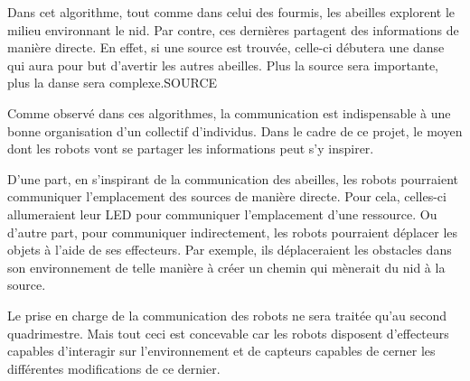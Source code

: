 Dans cet algorithme, tout comme dans celui des fourmis, les abeilles explorent le milieu environnant le nid. Par contre, ces dernières partagent des informations de manière directe. En effet, si une source est trouvée, celle-ci débutera une danse qui aura pour but d'avertir les autres abeilles. Plus la source sera importante, plus la danse sera complexe.SOURCE

Comme observé dans ces algorithmes, la communication est indispensable à une bonne organisation d'un collectif d'individus. Dans le cadre de ce projet, le moyen dont les robots vont se partager les informations peut s'y inspirer.

D'une part, en s'inspirant de la communication des abeilles, les robots pourraient communiquer l'emplacement des sources de manière directe. Pour cela, celles-ci allumeraient leur LED pour communiquer l'emplacement d'une ressource. Ou d'autre part, pour communiquer indirectement, les robots pourraient déplacer les objets à l'aide de ses effecteurs. Par exemple, ils déplaceraient les obstacles dans son environnement de telle manière à créer un chemin qui mènerait du nid à la source.

Le prise en charge de la communication des robots ne sera traitée qu'au second quadrimestre. Mais tout ceci est concevable car les robots disposent d'effecteurs capables d'interagir sur l'environnement et de capteurs capables de cerner les différentes modifications de ce dernier.
